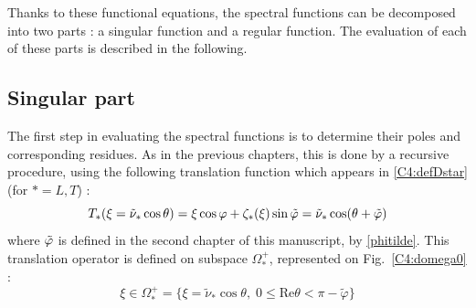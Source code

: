 Thanks to these functional equations, the spectral functions can be decomposed into two parts : a singular function and a regular function. The evaluation of each of these parts is described in the following.

\subsection{Singular part}
\label{C4:singpart}
The first step in evaluating the spectral functions is to determine their poles and corresponding residues. As in the previous chapters, this is done by a recursive procedure, using the following translation function which appears in \eqref{C4:defDstar} (for $*=L,T$) :
\begin{equation}
T_*(\xi=\tilde{\nu}_*\cos\theta)=\xi \cos \varphi+\zeta_*(\xi)\sin \tilde{\varphi}=\tilde{\nu}_*\cos(\theta+\tilde{\varphi})
\end{equation}
where $\tilde{\varphi}$ is defined in the second chapter of this manuscript, by \eqref{phitilde}. This translation operator is defined on subspace $\Omega_*^+$, represented on Fig.~\ref{C4:domega0} :
\begin{equation}
\xi \in \Omega_*^+= \{ \xi=\tilde{\nu}_* \cos \theta, \; 0 \leq \mbox{Re} \theta < \pi-\tilde{\varphi} \}
\label{C4:defOmega0}
\end{equation}


